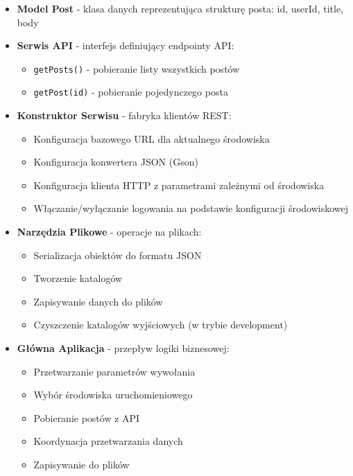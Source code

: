 \documentclass[12pt,a4paper]{article}
\begin{document}
\begin{itemize}
    \item \textbf{Model Post} - klasa danych reprezentująca strukturę posta: id, userId, title, body
    
    \item \textbf{Serwis API} - interfejs definiujący endpointy API:
    \begin{itemize}
        \item \texttt{getPosts()} - pobieranie listy wszystkich postów
        \item \texttt{getPost(id)} - pobieranie pojedynczego posta
    \end{itemize}
    
    \item \textbf{Konstruktor Serwisu} - fabryka klientów REST:
    \begin{itemize}
        \item Konfiguracja bazowego URL dla aktualnego środowiska
        \item Konfiguracja konwertera JSON (Gson)
        \item Konfiguracja klienta HTTP z parametrami zależnymi od środowiska
        \item Włączanie/wyłączanie logowania na podstawie konfiguracji środowiskowej
    \end{itemize}
    
    \item \textbf{Narzędzia Plikowe} - operacje na plikach:
    \begin{itemize}
        \item Serializacja obiektów do formatu JSON
        \item Tworzenie katalogów
        \item Zapisywanie danych do plików
        \item Czyszczenie katalogów wyjściowych (w trybie development)
    \end{itemize}
    
    \item \textbf{Główna Aplikacja} - przepływ logiki biznesowej:
    \begin{itemize}
        \item Przetwarzanie parametrów wywołania
        \item Wybór środowiska uruchomieniowego
        \item Pobieranie postów z API
        \item Koordynacja przetwarzania danych
        \item Zapisywanie do plików
    \end{itemize}
    

\end{itemize}
\end{document}
